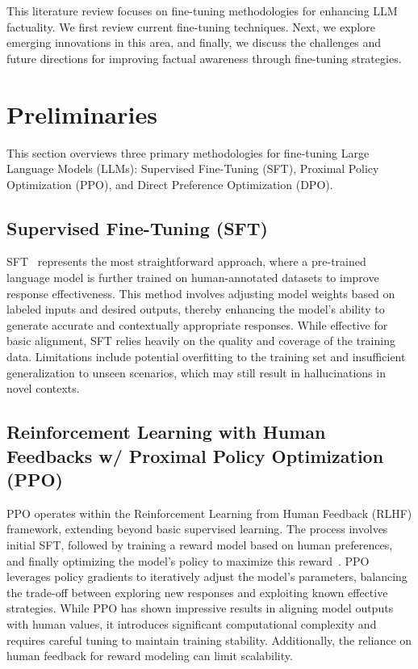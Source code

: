 \documentclass{article}
\begin{document}
This literature review focuses on fine-tuning methodologies for enhancing LLM factuality. We first review current fine-tuning techniques. Next, we explore emerging innovations in this area, and finally, we discuss the challenges and future directions for improving factual awareness through fine-tuning strategies.

\section{Preliminaries}
This section overviews three primary methodologies for fine-tuning Large Language Models (LLMs): Supervised Fine-Tuning (SFT), Proximal Policy Optimization (PPO), and Direct Preference Optimization (DPO).

\subsection{Supervised Fine-Tuning (SFT)}
SFT~\cite{zhang_instruction_2024} represents the most straightforward approach, where a pre-trained language model is further trained on human-annotated datasets to improve response effectiveness. This method involves adjusting model weights based on labeled inputs and desired outputs, thereby enhancing the model's ability to generate accurate and contextually appropriate responses. While effective for basic alignment, SFT relies heavily on the quality and coverage of the training data. Limitations include potential overfitting to the training set and insufficient generalization to unseen scenarios, which may still result in hallucinations in novel contexts.

\subsection{Reinforcement Learning with Human Feedbacks w/ Proximal Policy Optimization (PPO)}
PPO operates within the Reinforcement Learning from Human Feedback (RLHF) framework, extending beyond basic supervised learning. The process involves initial SFT, followed by training a reward model based on human preferences, and finally optimizing the model's policy to maximize this reward~\cite{stiennon_learning_2022}. PPO leverages policy gradients to iteratively adjust the model's parameters, balancing the trade-off between exploring new responses and exploiting known effective strategies. While PPO has shown impressive results in aligning model outputs with human values, it introduces significant computational complexity and requires careful tuning to maintain training stability. Additionally, the reliance on human feedback for reward modeling can limit scalability.
\end{document}
